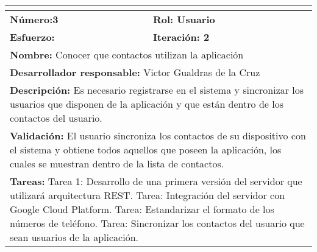 \begin{tabular}{|p{} |p{} |}
\hline
\multicolumn{2}{|l|}{\cellcolor[HTML]{C0C0C0}{\textbf{Historia de usuario}}} \\ \hline
\textbf{Número:3}           & \textbf{Rol: Usuario}          \\ \hline
\textbf{Esfuerzo:}           & \textbf{Iteración: 2}          \\ \hline
\multicolumn{2}{|p{0.8\textwidth}|}{\textbf{Nombre:} Conocer que contactos utilizan la aplicación} \\ \hline
\multicolumn{2}{|p{0.8\textwidth}|}{\textbf{Desarrollador responsable:} Victor Gualdras de la Cruz} \\ \hline
\multicolumn{2}{|p{0.8\textwidth}|}{\textbf{Descripción:}\newline
Es necesario registrarse en el sistema y sincronizar los usuarios que disponen de la aplicación y que están dentro de los contactos del usuario.} \\ \hline
\multicolumn{2}{|p{0.8\textwidth}|}{\textbf{Validación:}\newline
El usuario sincroniza los contactos de su dispositivo con el sistema y obtiene todos aquellos que poseen la aplicación, los cuales se muestran dentro de la lista de contactos.} \\ \hline
\multicolumn{2}{|p{0.8\textwidth}|}{\textbf{Tareas:}\newline
Tarea 1: Desarrollo de una primera versión del servidor que utilizará arquitectura REST.\newline
Tarea: Integración del servidor con Google Cloud Platform.\newline
Tarea: Estandarizar el formato de los números de teléfono.\newline
Tarea: Sincronizar los contactos del usuario que sean usuarios de la aplicación.} \\ \hline
\end{tabular}